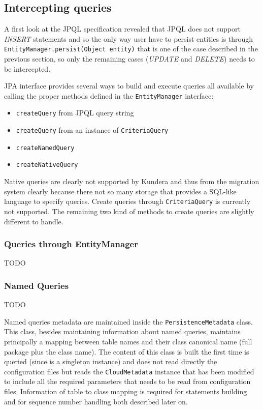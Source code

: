 \subsection{Intercepting queries}
A first look at the JPQL specification \cite{book:projpa2} revealed that JPQL does not support \textit{INSERT} statements and so the only way user have to persist entities is through \texttt{EntityManager.persist(Object entity)} that is one of the case described in the previous section, so only the remaining cases (\textit{UPDATE} and \textit{DELETE}) needs to be intercepted.

\noindent JPA interface provides several ways to build and execute queries all available by calling the proper methods defined in the \texttt{EntityManager} interface: 
\begin{itemize}
\item \texttt{createQuery} from JPQL query string
\item \texttt{createQuery} from an instance of \texttt{CriteriaQuery}
\item \texttt{createNamedQuery}
\item \texttt{createNativeQuery}
\end{itemize}
 
\noindent Native queries are clearly not supported by Kundera and thus from the migration system clearly because there not so many storage that provides a SQL-like language to specify queries.
Create queries through \texttt{CriteriaQuery} is currently not supported.
The remaining two kind of methods to create queries are slightly different to handle.

\subsubsection{Queries through EntityManager}
TODO

\subsubsection{Named Queries}
TODO

\noindent Named queries metadata are maintained inside the \texttt{PersistenceMetadata} class. This class, besides maintaining information about named queries, maintains principally a mapping between table names and their class canonical name (full package plus the class name). The content of this class is built the first time is queried (since is a singleton instance) and does not read directly the  configuration files but reads the \texttt{CloudMetadata} instance that has been modified to include all the required parameters that needs to be read from configuration files. 
Information of table to class mapping is required for statements building and for sequence number handling both described later on.
 

